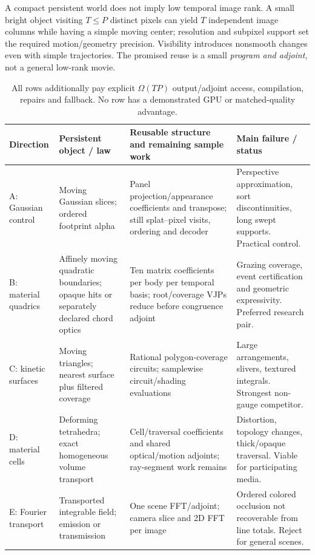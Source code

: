 \documentclass[10pt,letterpaper]{article}
\theoremstyle{remark}\newtheorem{counterexample}[proposition]{Counterexample}
\begin{document}
A compact persistent world does not imply low temporal image rank. A small bright object visiting $T\leq P$ distinct pixels can yield $T$ independent image columns while having a simple moving center; resolution and subpixel support set the required motion/geometry precision. Visibility introduces nonsmooth changes even with simple trajectories. The promised reuse is a small \emph{program and adjoint}, not a general low-rank movie.

\begin{table}[ht]
\centering\small
\begin{tabularx}{\textwidth}{@{}>{\raggedright\arraybackslash}p{}>{\raggedright\arraybackslash}p{}>{\raggedright\arraybackslash}X >{\raggedright\arraybackslash}p{}@{}}
\toprule
Direction & Persistent object / law & Reusable structure and remaining sample work & Main failure / status\\
\midrule
A: Gaussian control & Moving Gaussian slices; ordered footprint alpha & Panel projection/appearance coefficients and transpose; still splat--pixel visits, ordering and decoder & Perspective approximation, sort discontinuities, long swept supports. Practical control.\\[3pt]
B: material quadrics & Affinely moving quadratic boundaries; opaque hits or separately declared chord optics & Ten matrix coefficients per body per temporal basis; root/coverage VJPs reduce before congruence adjoint & Grazing coverage, event certification and geometric expressivity. Preferred research pair.\\[3pt]
C: kinetic surfaces & Moving triangles; nearest surface plus filtered coverage & Rational polygon-coverage circuits; samplewise circuit/shading evaluations & Large arrangements, slivers, textured integrals. Strongest non-gauge competitor.\\[3pt]
D: material cells & Deforming tetrahedra; exact homogeneous volume transport & Cell/traversal coefficients and shared optical/motion adjoints; ray-segment work remains & Distortion, topology changes, thick/opaque traversal. Viable for participating media.\\[3pt]
E: Fourier transport & Transported integrable field; emission or transmission & One scene FFT/adjoint; camera slice and 2D FFT per image & Ordered colored occlusion not recoverable from line totals. Reject for general scenes.\\
\bottomrule
\end{tabularx}
\caption{All rows additionally pay explicit $\Omega(TP)$ output/adjoint access, compilation, repairs and fallback. No row has a demonstrated GPU or matched-quality advantage.}
\end{table}
\end{document}

